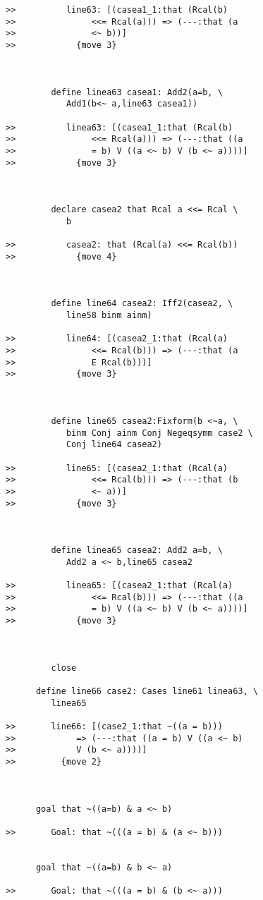 \documentclass[12pt]{article}
\begin{document}
\begin{verbatim}
>>          line63: [(casea1_1:that (Rcal(b)
>>               <<= Rcal(a))) => (---:that (a
>>               <~ b))]
>>            {move 3}



         define linea63 casea1: Add2(a=b, \
            Add1(b<~ a,line63 casea1))

>>          linea63: [(casea1_1:that (Rcal(b)
>>               <<= Rcal(a))) => (---:that ((a
>>               = b) V ((a <~ b) V (b <~ a))))]
>>            {move 3}



         declare casea2 that Rcal a <<= Rcal \
            b

>>          casea2: that (Rcal(a) <<= Rcal(b))
>>            {move 4}



         define line64 casea2: Iff2(casea2, \
            line58 binm ainm)

>>          line64: [(casea2_1:that (Rcal(a)
>>               <<= Rcal(b))) => (---:that (a
>>               E Rcal(b)))]
>>            {move 3}



         define line65 casea2:Fixform(b <~a, \
            binm Conj ainm Conj Negeqsymm case2 \
            Conj line64 casea2)

>>          line65: [(casea2_1:that (Rcal(a)
>>               <<= Rcal(b))) => (---:that (b
>>               <~ a))]
>>            {move 3}



         define linea65 casea2: Add2 a=b, \
            Add2 a <~ b,line65 casea2

>>          linea65: [(casea2_1:that (Rcal(a)
>>               <<= Rcal(b))) => (---:that ((a
>>               = b) V ((a <~ b) V (b <~ a))))]
>>            {move 3}



         close

      define line66 case2: Cases line61 linea63, \
         linea65

>>       line66: [(case2_1:that ~((a = b)))
>>            => (---:that ((a = b) V ((a <~ b)
>>            V (b <~ a))))]
>>         {move 2}



      goal that ~((a=b) & a <~ b)

>>       Goal: that ~(((a = b) & (a <~ b)))


      goal that ~((a=b) & b <~ a)

>>       Goal: that ~(((a = b) & (b <~ a)))



\end{verbatim}
\end{document}
